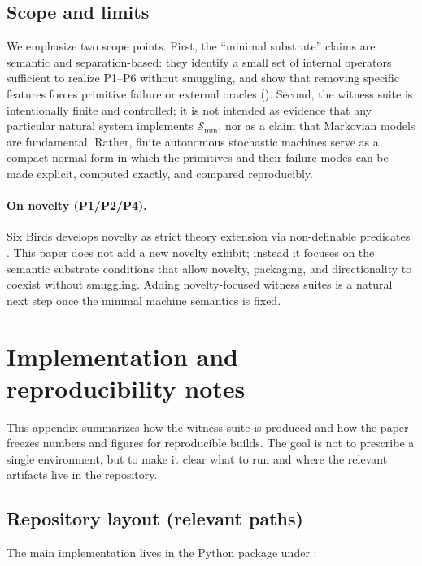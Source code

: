 \documentclass[11pt]{article}
\theoremstyle{definition}
\theoremstyle{remark}
\begin{document}
\subsection{Scope and limits}

We emphasize two scope points.
First, the ``minimal substrate'' claims are semantic and separation-based: they identify a small set of internal operators sufficient to realize P1--P6 without smuggling, and show that removing specific features forces primitive failure or external oracles ().
Second, the witness suite is intentionally finite and controlled; it is not intended as evidence that any particular natural system implements $\mathcal S_{\min}$, nor as a claim that Markovian models are fundamental.
Rather, finite autonomous stochastic machines serve as a compact normal form in which the primitives and their failure modes can be made explicit, computed exactly, and compared reproducibly.

\paragraph{On novelty (P1/P2/P4).}
Six Birds develops novelty as strict theory extension via non-definable predicates \citep{sixbirds2026}.
This paper does not add a new novelty exhibit; instead it focuses on the semantic substrate conditions that allow novelty, packaging, and directionality to coexist without smuggling.
Adding novelty-focused witness suites is a natural next step once the minimal machine semantics is fixed.
 \appendix
\section{Implementation and reproducibility notes}
\label{app:repro}
\sloppy

This appendix summarizes how the witness suite is produced and how the paper freezes numbers and figures for reproducible builds.
The goal is not to prescribe a single environment, but to make it clear what to run and where the relevant artifacts live in the repository.

\subsection{Repository layout (relevant paths)}

The main implementation lives in the Python package under :
\end{document}
